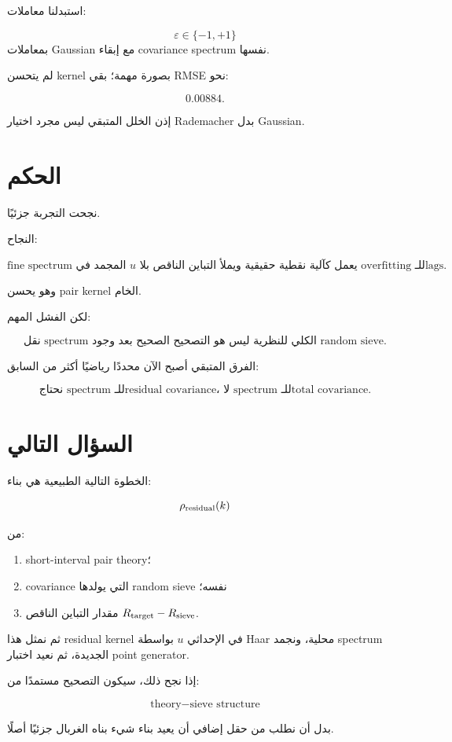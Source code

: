 \documentclass[12pt]{article}
\begin{document}
استبدلنا معاملات:

\[
\varepsilon\in\{-1,+1\}
\]
بمعاملات Gaussian مع إبقاء covariance spectrum نفسها.

لم يتحسن kernel بصورة مهمة؛ بقي RMSE نحو:

\[
0.00884.
\]

إذن الخلل المتبقي ليس مجرد اختيار Rademacher بدل Gaussian.

\section{الحكم}

نجحت التجربة جزئيًا.

النجاح:

\[
\boxed{
\text{fine spectrum المجمد في }u
\text{ يعمل كآلية نقطية حقيقية ويملأ التباين الناقص بلا overfitting للـlags.}
}
\]

وهو يحسن pair kernel الخام.

لكن الفشل المهم:

\[
\boxed{
\text{نقل spectrum الكلي للنظرية ليس هو التصحيح الصحيح بعد وجود random sieve.}
}
\]

الفرق المتبقي أصبح الآن محددًا رياضيًا أكثر من السابق:

\[
\boxed{
\text{نحتاج spectrum للـresidual covariance، لا spectrum للـtotal covariance.}
}
\]

\section{السؤال التالي}

الخطوة التالية الطبيعية هي بناء:

\[
\rho_{\rm residual}(k)
\]

من:

\begin{enumerate}
\item short-interval pair theory؛
\item covariance التي يولدها random sieve نفسه؛
\item مقدار التباين الناقص \(R_{\rm target}-R_{\rm sieve}\).
\end{enumerate}

ثم نمثل هذا residual kernel في الإحداثي \(u\) بواسطة Haar محلية،
ونجمد spectrum الجديدة، ثم نعيد اختبار point generator.

إذا نجح ذلك، سيكون التصحيح مستمدًا من:

\[
\boxed{
\text{theory} - \text{sieve structure}
}
\]

بدل أن نطلب من حقل إضافي أن يعيد بناء شيء بناه الغربال جزئيًا أصلًا.
\end{document}
